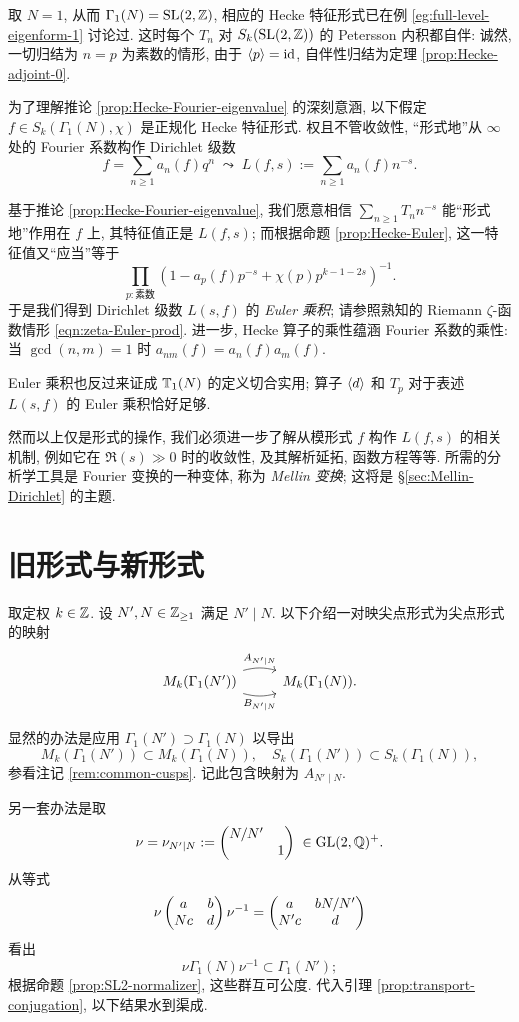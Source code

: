 \begin{example}
	取 $N = 1$, 从而 $\Gamma_1(N) = \operatorname{SL}(2,\mathbb{Z})$, 相应的 Hecke 特征形式已在例 \ref{eg:full-level-eigenform-1} 讨论过. 这时每个 $T_n$ 对 $S_k(\operatorname{SL}(2,\mathbb{Z}))$ 的 Petersson 内积都自伴: 诚然, 一切归结为 $n = p$ 为素数的情形, 由于 $\left\langle p \right\rangle = \mathrm{id}$, 自伴性归结为定理 \ref{prop:Hecke-adjoint-0}.
\end{example}

为了理解推论 \ref{prop:Hecke-Fourier-eigenvalue} 的深刻意涵, 以下假定 $f \in S_k(\Gamma_1(N), \chi)$ 是正规化 Hecke 特征形式. 权且不管收敛性, ``形式地''从 $\infty$ 处的 Fourier 系数构作 Dirichlet 级数
\[ f = \sum_{n \geq 1} a_n(f) q^n \;\leadsto\; L(f,s) := \sum_{n \geq 1} a_n(f) n^{-s}. \]

基于推论 \ref{prop:Hecke-Fourier-eigenvalue}, 我们愿意相信 $\sum_{n \geq 1} T_n n^{-s}$ 能``形式地''作用在 $f$ 上, 其特征值正是 $L(f,s)$; 而根据命题 \ref{prop:Hecke-Euler}, 这一特征值又``应当''等于
\[ \prod_{p: \text{素数}} \left( 1 - a_p(f) p^{-s} + \chi(p) p^{k-1-2s} \right)^{-1}. \]
于是我们得到 Dirichlet 级数 $L(s,f)$ 的 \emph{Euler 乘积}; 请参照熟知的 Riemann $\zeta$-函数情形 \eqref{eqn:zeta-Euler-prod}. 进一步, Hecke 算子的乘性蕴涵 Fourier 系数的乘性: 当 $\gcd(n,m)=1$ 时 $a_{nm}(f) = a_n(f) a_m(f)$.

Euler 乘积也反过来证成 $\mathbb{T}_1(N)$ 的定义切合实用; 算子 $\left\langle d \right\rangle$ 和 $T_p$ 对于表述 $L(s,f)$ 的 Euler 乘积恰好足够.

然而以上仅是形式的操作, 我们必须进一步了解从模形式 $f$ 构作 $L(f,s)$ 的相关机制, 例如它在 $\Re(s) \gg 0$ 时的收敛性, 及其解析延拓, 函数方程等等. 所需的分析学工具是 Fourier 变换的一种变体, 称为 \emph{Mellin 变换}; 这将是 \S\ref{sec:Mellin-Dirichlet} 的主题.

\section{旧形式与新形式}\label{sec:oldform}
取定权 $k \in \mathbb{Z}$. 设 $N', N \in \mathbb{Z}_{\geq 1}$ 满足 $N' \mid N$. 以下介绍一对映尖点形式为尖点形式的映射
\[\begin{tikzcd}
	M_k(\Gamma_1(N')) \arrow[r, bend left=15, "A_{N' \mid N}"] \arrow[r, bend right=15, "B_{N' \mid N}"'] & M_k(\Gamma_1(N)).
\end{tikzcd}\]

\begin{asparaenum}[(A)]
	\item 显然的办法是应用 $\Gamma_1(N') \supset \Gamma_1(N)$ 以导出
	\[ M_k(\Gamma_1(N')) \subset M_k(\Gamma_1(N)), \quad S_k(\Gamma_1(N')) \subset S_k(\Gamma_1(N)), \]
	参看注记 \ref{rem:common-cusps}. 记此包含映射为 $A_{N' \mid N}$.
	\item 另一套办法是取
	\[ \nu = \nu_{N' \mid N} := \begin{pmatrix} N/N' &  \\  & 1 \end{pmatrix} \; \in \operatorname{GL}(2,\mathbb{Q})^+. \]
	从等式
	\[ \nu \begin{pmatrix} a & b \\ Nc & d \end{pmatrix} \nu^{-1} = \begin{pmatrix} a & bN/N' \\ N'c & d \end{pmatrix} \]
	看出
	\[ \nu \Gamma_1(N) \nu^{-1} \subset \Gamma_1(N'); \]
	根据命题 \ref{prop:SL2-normalizer}, 这些群互可公度. 代入引理 \ref{prop:transport-conjugation}, 以下结果水到渠成.
\end{asparaenum}

